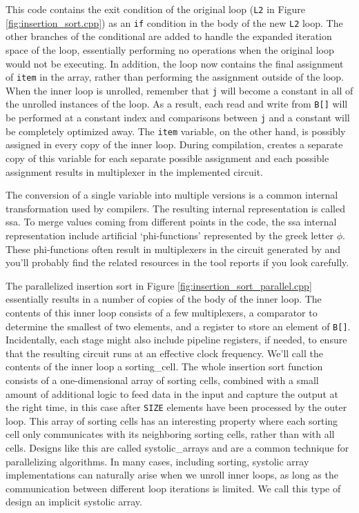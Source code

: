 This code contains the exit condition of the original loop (\lstinline{L2} in Figure \ref{fig:insertion_sort.cpp}) as an \lstinline{if} condition in the body of the new \lstinline{L2} loop.  The other branches of the conditional are added to handle the expanded iteration space of the loop, essentially performing no operations when the original loop would not be executing.  In addition, the loop now contains the final assignment of \lstinline{item} in the array, rather than performing the assignment outside of the loop.  When the inner loop is unrolled, remember that \lstinline{j} will become a constant in all of the unrolled instances of the loop.  As a result, each read and write from \lstinline{B[]} will be performed at a constant index and comparisons between \lstinline{j} and a constant will be completely optimized away.  The \lstinline{item} variable, on the other hand, is possibly assigned in every copy of the inner loop.  During compilation, \VHLS creates a separate copy of this variable for each separate possible assignment and each possible assignment results in multiplexer in the implemented circuit.

\begin{aside}
The conversion of a single variable into multiple versions is a common internal transformation used by compilers.  The resulting internal representation is called \gls{ssa}.  To merge values coming from different points in the code, the \gls{ssa} internal representation include artificial `phi-functions' represented by the greek letter $\phi$.  These phi-functions often result in multiplexers in the circuit generated by \VHLS and you'll probably find the related resources in the tool reports if you look carefully.
\end{aside}

The parallelized insertion sort in Figure \ref{fig:insertion_sort_parallel.cpp} essentially results in a number of copies of the body of the inner loop.   The contents of this inner loop consists of a few multiplexers, a comparator to determine the smallest of two elements, and a register to store an element of \lstinline{B[]}.  Incidentally, each stage might also include pipeline registers, if needed, to ensure that the resulting circuit runs at an effective clock frequency.  We'll call the contents of the inner loop a \gls{sorting_cell}.  The whole insertion sort function consists of a one-dimensional array of sorting cells, combined with a small amount of additional logic to feed data in the input and capture the output at the right time, in this case after \lstinline{SIZE} elements have been processed by the outer loop.  This array of sorting cells has an interesting property where each sorting cell only communicates with its neighboring sorting cells, rather than with all cells.  Designs like this are called \glspl{systolic_array} and are a common technique for parallelizing algorithms. In many cases, including sorting, systolic array implementations can naturally arise when we unroll inner loops, as long as the communication between different loop iterations is limited.   We call this type of design an implicit systolic array.

